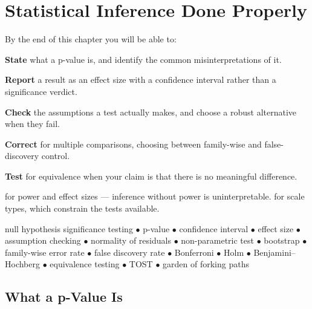 \chapter{Statistical Inference Done Properly}\label{ch:inference}

\begin{outcomes}
By the end of this chapter you will be able to:
\begin{tight}
  \item \textbf{State} what a p-value is, and identify the common
    misinterpretations of it.
  \item \textbf{Report} a result as an effect size with a confidence interval
    rather than a significance verdict.
  \item \textbf{Check} the assumptions a test actually makes, and choose a
    robust alternative when they fail.
  \item \textbf{Correct} for multiple comparisons, choosing between family-wise
    and false-discovery control.
  \item \textbf{Test} for equivalence when your claim is that there is no
    meaningful difference.
\end{tight}
\end{outcomes}

\begin{prereq}
 for power and effect sizes --- inference without power is
uninterpretable.  for scale types, which constrain the
tests available.
\end{prereq}

\begin{keyterms}
null hypothesis significance testing $\bullet$ p-value $\bullet$ confidence
interval $\bullet$ effect size $\bullet$ assumption checking $\bullet$
normality of residuals $\bullet$ non-parametric test $\bullet$ bootstrap
$\bullet$ family-wise error rate $\bullet$ false discovery rate $\bullet$
Bonferroni $\bullet$ Holm $\bullet$ Benjamini--Hochberg $\bullet$ equivalence
testing $\bullet$ TOST $\bullet$ garden of forking paths
\end{keyterms}

\section{What a p-Value Is}

